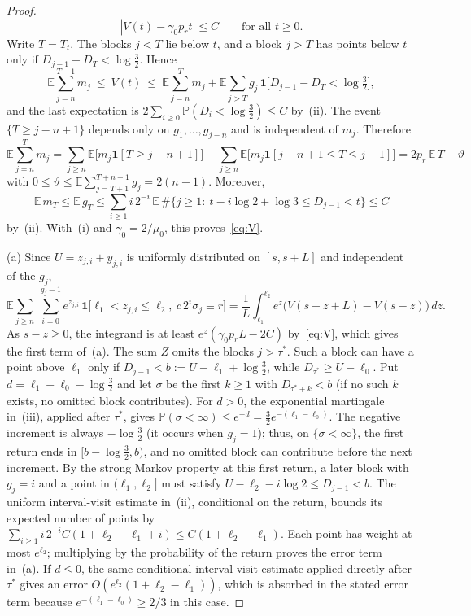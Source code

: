 \documentclass[12pt]{amsart}
\theoremstyle{definition}
\theoremstyle{remark}
\begin{document}
\begin{proof}
\begin{equation}
\label{eq:V}
|V(t)-\gamma_0p_rt|\le C\qquad\text{for all }t\ge0 .
\end{equation}
Write $T=T_t$. The blocks $j<T$ lie below $t$, and a block $j>T$ has points below $t$ only if $D_{j-1}-D_T<\log\tfrac32$. Hence
\[
\mathbb E\sum_{j=n}^{T-1}m_j\ \le\ V(t)\ \le\ \mathbb E\sum_{j=n}^{T}m_j+\mathbb E\sum_{j>T}g_j\,\mathbf 1\bigl[D_{j-1}-D_T<\log\tfrac32\bigr],
\]
and the last expectation is $2\sum_{i\ge0}\mathbb P(D_i<\log\tfrac32)\le C$ by~(ii). The event $\{T\ge j-n+1\}$ depends only on $g_1,\ldots,g_{j-n}$ and is independent of $m_j$. Therefore
\[
\mathbb E\sum_{j=n}^{T}m_j=\sum_{j\ge n}\mathbb E\bigl[m_j\mathbf 1[T\ge j-n+1]\bigr]-\sum_{j\ge n}\mathbb E\bigl[m_j\mathbf 1[j-n+1\le T\le j-1]\bigr]=2p_r\,\mathbb E\,T-\vartheta
\]
with $0\le\vartheta\le\mathbb E\sum_{j=T+1}^{T+n-1}g_j=2(n-1)$. Moreover,
\[
\mathbb E\,m_T\le\mathbb E\,g_T\le\sum_{i\ge1}i\,2^{-i}\,\mathbb E\,\#\bigl\{j\ge1:\ t-i\log2+\log3\le D_{j-1}<t\bigr\}\le C
\]
by~(ii). With~(i) and $\gamma_0=2/\mu_0$, this proves~\eqref{eq:V}.

(a) Since $U=z_{j,i}+y_{j,i}$ is uniformly distributed on $[s,s+L]$ and independent of the $g_j$,
\[
\mathbb E\sum_{j\ge n}\ \sum_{i=0}^{g_j-1}e^{z_{j,i}}\,\mathbf 1\bigl[\ell_1<z_{j,i}\le\ell_2,\ c\,2^i\sigma_j\equiv r\bigr]=\frac1L\int_{\ell_1}^{\ell_2}e^z\bigl(V(s-z+L)-V(s-z)\bigr)\,dz .
\]
As $s-z\ge0$, the integrand is at least $e^z(\gamma_0p_rL-2C)$ by~\eqref{eq:V}, which gives the first term of~(a). The sum $Z$ omits the blocks $j>\tau^*$. Such a block can have a point above $\ell_1$ only if
$D_{j-1}<b:=U-\ell_1+\log\tfrac32$, while
$D_{\tau^*}\ge U-\ell_0$. Put
$d=\ell_1-\ell_0-\log\tfrac32$ and let $\sigma$ be the first
$k\ge1$ with $D_{\tau^*+k}<b$ (if no such $k$ exists, no
omitted block contributes). For $d>0$, the exponential martingale
in~(iii), applied after $\tau^*$, gives
$\mathbb P(\sigma<\infty)\le e^{-d}
=\tfrac32e^{-(\ell_1-\ell_0)}$.
The negative increment is always $-\log\tfrac32$ (it occurs when
$g_j=1$); thus, on $\{\sigma<\infty\}$, the first return ends
in $[b-\log\tfrac32,b)$, and no omitted block can contribute
before the next increment. By the strong Markov property at this
first return, a later block with $g_j=i$ and a point in
$(\ell_1,\ell_2]$ must satisfy
$U-\ell_2-i\log2\le D_{j-1}<b$. The uniform interval-visit
estimate in~(ii), conditional on the return, bounds its expected
number of points by
$\sum_{i\ge1}i\,2^{-i}C(1+\ell_2-\ell_1+i)
\le C(1+\ell_2-\ell_1)$.
Each point has weight at most $e^{\ell_2}$; multiplying by the
probability of the return proves the error term in~(a).
If $d\le0$, the same conditional interval-visit estimate applied
directly after $\tau^*$ gives an error
$O(e^{\ell_2}(1+\ell_2-\ell_1))$, which is absorbed in the
stated error term because
$e^{-(\ell_1-\ell_0)}\ge 2/3$ in this case.


\end{proof}
\end{document}

